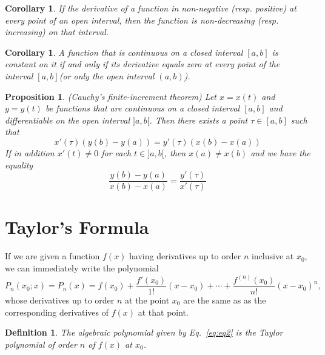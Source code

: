 \documentclass[a4paper,12pt]{article} %
\newtheorem{definition}{Definition}[section]
\newtheorem{proposition}{Proposition}[section]
\newtheorem{corollary}[theorem]{Corollary}
\begin{document}
\begin{corollary}
    \normalfont If the derivative of a function in non-negative (resp. 
    positive) at every point of an open interval, then the function is 
    non-decreasing (resp. increasing) on that interval.
\end{corollary}

\begin{corollary}
    \normalfont
    A function that is continuous on a closed interval $[a,b]$ is constant 
    on it if and only if its derivative equals zero at every point of the 
    interval $[a,b]$(or only the open interval $(a,b)$).
\end{corollary}

\begin{proposition}{\rm (Cauchy's finite-increment theorem)}
    \normalfont Let $x = x(t)$ and $y = y(t)$ be functions that are continuous 
    on a closed interval $[a,b]$ and differentiable on the open interval $]a,b[$.
    Then there exists a point $\tau \in [a,b]$ such that 
    \[
        x'(\tau)(y(b) - y(a)) = y'(\tau)(x(b) - x(a))
        \]
    If in addition $x'(t) \ne 0$ for each $t \in ]a,b[$, then $x(a) \ne x(b)$
    and we have the equality 
    \[
        \frac{y(b) - y(a)}{x(b) - x(a)} = \frac{y'(\tau)}{x'(\tau)}
        \]
\end{proposition}

\section{Taylor's Formula}
If we are given a function $f(x)$ having derivatives up to order $n$
inclusive at $x_0$, we can immediately write the polynomial
\begin{equation}
    P_n(x_0;x) = P_n(x) = f(x_0) + \frac{f'(x_0)}{1!}(x - x_0) + 
    \cdots + \frac{f^{(n)}(x_0)}{n!}(x - x_0)^n,
    \label{eq:eq2}
\end{equation}
whose derivatives up to order $n$ at the point $x_0$ are the same as 
as the corresponding derivatives of $f(x)$ at that point.

\begin{definition}
    \normalfont The algebraic polynomial given by Eq.~\ref{eq:eq2} is the 
    Taylor polynomial of order $n$ of $f(x)$ at $x_0$.
\end{definition}
\end{document}
